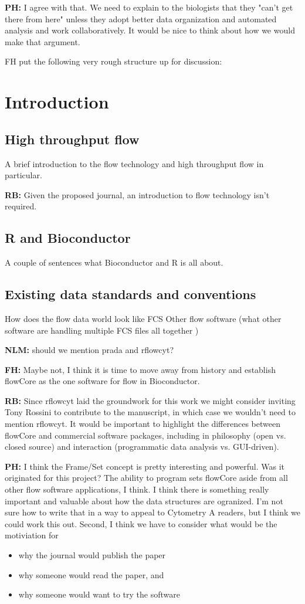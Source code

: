 \documentclass[12pt]{article}
\begin{document}
{\bf PH:} I agree with that. We need to explain to the biologists that they
"can't get there from here" unless they adopt better data organization
and automated analysis and work collaboratively. It would be nice to
think about how we would make that argument.

\bigskip
FH put the following very rough structure up for discussion:

\section{Introduction}

\subsection{High throughput flow}
A brief introduction to the flow technology and high throughput flow
in particular.
 
{\bf RB:} Given the proposed journal, an introduction to flow technology isn't
required.

\subsection{R and Bioconductor}
A couple of sentences what Bioconductor and R is all
about.

\subsection{Existing data standards and conventions}
How does the flow data world look like FCS Other flow software (what
other software are handling multiple FCS files all together ) 

{\bf NLM:} should we mention prada and rflowcyt?  

{\bf FH:} Maybe not, I think it is time to move away from history and
establish flowCore as the one software for flow in Bioconductor.

{\bf RB:} Since rflowcyt laid the groundwork for this work we might consider
inviting Tony Rossini to contribute to the manuscript, in which case we
wouldn't need to mention rflowcyt. It would be important to highlight
the differences between flowCore and commercial software packages,
including in philosophy (open vs. closed source) and interaction
(programmatic data analysis vs. GUI-driven). 

{\bf PH:} I think the Frame/Set concept is pretty interesting and
powerful. Was it originated for this project? The ability to program
sets flowCore aside from all other flow software applications, I
think. I think there is something really important and valuable about
how the data structures are ogranized. I'm not sure how to write that
in a way to appeal to Cytometry A readers, but I think we could work
this out. Second, I think we have to consider what would be the
motiviation for 
\begin{itemize}
\item why the journal would publish the paper 
\item why someone would read the paper, and
\item why someone would want to try the software
\end{itemize}
\end{document}
